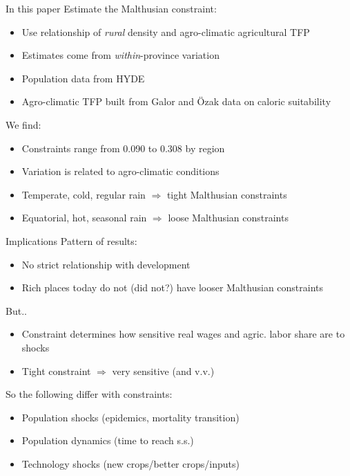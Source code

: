 \documentclass[10pt, xcolor=dvipsnames]{beamer}
\begin{document}
\begin{frame}{In this paper}
Estimate the Malthusian constraint:
\begin{itemize}
  \item Use relationship of \textit{rural} density and agro-climatic agricultural TFP
  \item Estimates come from \textit{within}-province variation
  \item Population data from HYDE
  \item Agro-climatic TFP built from Galor and {\"O}zak data on caloric suitability
\end{itemize}

\vspace{.2cm} We find:
\begin{itemize}
  \item Constraints range from 0.090 to 0.308 by region
  \item Variation is related to agro-climatic conditions
  \item Temperate, cold, regular rain $\Rightarrow$ tight Malthusian constraints
  \item Equatorial, hot, seasonal rain $\Rightarrow$ loose Malthusian constraints
\end{itemize}

\end{frame}

\begin{frame}{Implications}
Pattern of results:
\begin{itemize}
  \item No strict relationship with development
  \item Rich places today do not (did not?) have looser Malthusian constraints
\end{itemize}

\vspace{.2cm} But..
\begin{itemize}
  \item Constraint determines how sensitive real wages and agric. labor share are to shocks
  \item Tight constraint $\Rightarrow$ very sensitive (and v.v.)
\end{itemize}

\vspace{.2cm} So the following differ with constraints:
\begin{itemize}
  \item Population shocks (epidemics, mortality transition)
  \item Population dynamics (time to reach s.s.)
  \item Technology shocks (new crops/better crops/inputs)
\end{itemize}

\end{frame}
\end{document}
